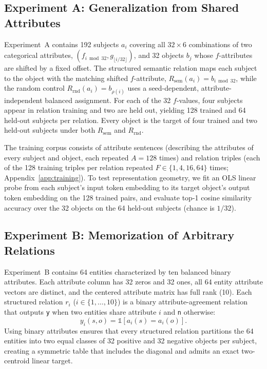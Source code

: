 \documentclass[11pt]{article}
\newcommand{\Rsem}{R_{\mathrm{sem}}}
\newcommand{\Rrnd}{R_{\mathrm{rnd}}}
\begin{document}
\subsection{Experiment A: Generalization from Shared Attributes}

Experiment~A contains 192 subjects $a_i$ covering all $32\times 6$ combinations
of two categorical attributes, $(f_{i\bmod 32},g_{\lfloor i/32\rfloor})$, and 32
objects $b_j$ whose $f$-attributes are shifted by a fixed offset. The structured
semantic relation maps each subject to the object with the matching shifted
$f$-attribute, $\Rsem(a_i)=b_{i\bmod32}$, while the random control
$\Rrnd(a_i)=b_{\rho(i)}$ uses a seed-dependent, attribute-independent balanced
assignment. For each of the 32 $f$-values, four subjects appear in relation
training and two are held out, yielding 128 trained and 64 held-out subjects per
relation. Every object is the target of four trained and two held-out subjects
under both $\Rsem$ and $\Rrnd$.

The training corpus consists of attribute sentences (describing the attributes
of every subject and object, each repeated $A=128$ times) and relation triples
(each of the 128 training triples per relation repeated $F\in\{1,4,16,64\}$
times; Appendix~\ref{app:training}). To test representation geometry, we fit an
OLS linear probe from each subject's input token embedding to its target
object's output token embedding on the 128 trained pairs, and evaluate top-1
cosine similarity accuracy over the 32 objects on the 64 held-out subjects
(chance is $1/32$).

\subsection{Experiment B: Memorization of Arbitrary Relations}

Experiment~B contains 64 entities characterized by ten balanced binary
attributes. Each attribute column has 32 zeros and 32 ones, all 64 entity
attribute vectors are distinct, and the centered attribute matrix has full rank
(10). Each structured relation $r_i$ ($i\in\{1,\dots,10\}$) is a binary
attribute-agreement relation that outputs \texttt{y} when two entities share
attribute $i$ and \texttt{n} otherwise:
\begin{equation}
  y_i(s,o)=\mathbb{1}[a_i(s)=a_i(o)].
  \label{eq:equality}
\end{equation}
Using binary attributes ensures that every structured relation partitions the 64
entities into two equal classes of 32 positive and 32 negative objects per
subject, creating a symmetric table that includes the diagonal and admits an
exact two-centroid linear target.
\end{document}
